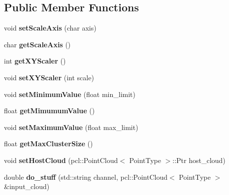 \subsection*{Public Member Functions}
\begin{DoxyCompactItemize}
\item 
\mbox{\label{classpcl__gpu_1_1FilterPassThrough_a1b26811a9d3ba81ddbb0f063b5b62251}} 
void {\bfseries set\+Scale\+Axis} (char axis)
\item 
\mbox{\label{classpcl__gpu_1_1FilterPassThrough_a717660b3b276b50fb04f0fb520337109}} 
char {\bfseries get\+Scale\+Axis} ()
\item 
\mbox{\label{classpcl__gpu_1_1FilterPassThrough_a3fd18658d3f90f9926bf63ebeb2977ae}} 
int {\bfseries get\+X\+Y\+Scaler} ()
\item 
\mbox{\label{classpcl__gpu_1_1FilterPassThrough_a13e6abe145f7f9bf4fabaa08cd54ecba}} 
void {\bfseries set\+X\+Y\+Scaler} (int scale)
\item 
\mbox{\label{classpcl__gpu_1_1FilterPassThrough_a9d07351f5596c8eb2e3213271a80c6cf}} 
void {\bfseries set\+Minimum\+Value} (float min\+\_\+limit)
\item 
\mbox{\label{classpcl__gpu_1_1FilterPassThrough_a99f02fff797f878c339f26a8485d48d3}} 
float {\bfseries get\+Mimumum\+Value} ()
\item 
\mbox{\label{classpcl__gpu_1_1FilterPassThrough_a01ee0989ece713b2cd0e5a320869d1cd}} 
void {\bfseries set\+Maximum\+Value} (float max\+\_\+limit)
\item 
\mbox{\label{classpcl__gpu_1_1FilterPassThrough_a2541b063e68c30bc59682b33ddf3935a}} 
float {\bfseries get\+Max\+Cluster\+Size} ()
\item 
\mbox{\label{classpcl__gpu_1_1FilterPassThrough_ab0e97a1607367e44d8d4256e0a046fae}} 
void {\bfseries set\+Host\+Cloud} (pcl\+::\+Point\+Cloud$<$ Point\+Type $>$\+::Ptr host\+\_\+cloud)
\item 
\mbox{\label{classpcl__gpu_1_1FilterPassThrough_a4dfd2dd4c4781b9073ccf50693fc5acc}} 
double {\bfseries do\+\_\+stuff} (std\+::string channel, pcl\+::\+Point\+Cloud$<$ Point\+Type $>$ \&input\+\_\+cloud)
\end{DoxyCompactItemize}
